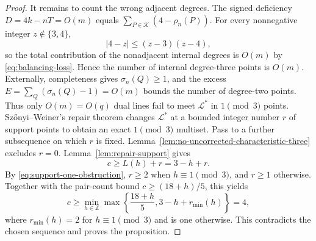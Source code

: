 \begin{proof}
It remains to count the wrong adjacent degrees.  The signed deficiency
\(D=4k-nT=O(m)\) equals \(\sum_{P\in\mathcal K}(4-\rho_n(P))\).
For every nonnegative integer \(z\notin\{3,4\}\),
\[
 |4-z|\le (z-3)(z-4),
\]
so the total contribution of the nonadjacent internal degrees is \(O(m)\)
by \eqref{eq:balancing-loss}.  Hence the number of internal degree-three
points is \(O(m)\).  Externally, completeness gives \(\sigma_n(Q)\ge1\), and
the excess \(E=\sum_Q(\sigma_n(Q)-1)=O(m)\) bounds the number of degree-two
points.  Thus only \(O(m)=O(q)\) dual lines fail to meet \(\mathcal L^*\) in
\(1\pmod3\) points.
Sz\H{o}nyi--Weiner's repair theorem changes
\(\mathcal L^*\) at a bounded integer number \(r\) of support points to obtain
an exact \(1\pmod3\) multiset.  Pass to a further subsequence on which \(r\)
is fixed.  Lemma~\ref{lem:no-uncorrected-characteristic-three}
excludes \(r=0\).  Lemma~\ref{lem:repair-support} gives
\[
 c\ge L(h)+r=3-h+r.
\]
By \eqref{eq:support-one-obstruction}, \(r\ge2\) when
\(h\equiv1\pmod3\), and \(r\ge1\) otherwise.  Together with the pair-count
bound \(c\ge(18+h)/5\), this yields
\begin{equation}\label{eq:characteristic-three-minimum}
 c\ge
 \min_{h\in\mathbb Z}
 \max\left\{\frac{18+h}{5},3-h+r_{\min}(h)\right\}=4,
\end{equation}
where \(r_{\min}(h)=2\) for \(h\equiv1\pmod3\) and is one otherwise.  This
contradicts the chosen sequence and proves the proposition.
\end{proof}

